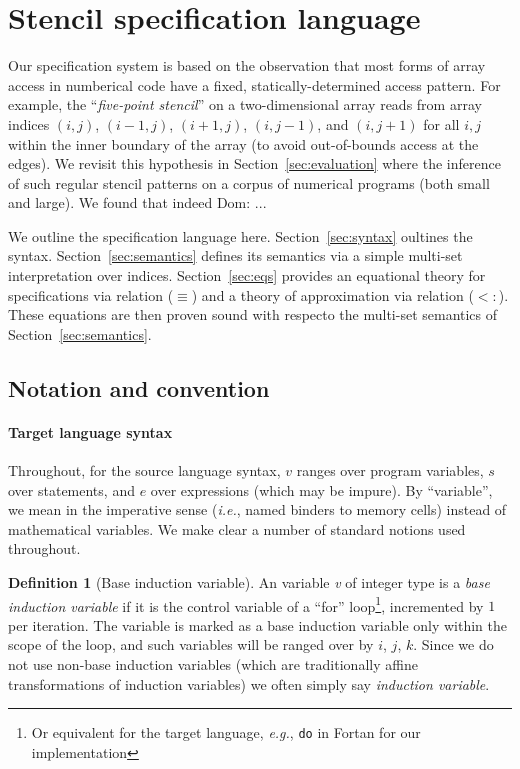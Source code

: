 \documentclass[9pt]{sigplanconf}
\newcommand{\dnote}[1]{\textcolor{darkpurple}{Dom: #1}}
\newcounter{block}
\theoremstyle{definition}
\newtheorem{definition}[block]{Definition}
\newcommand{\ie}{\emph{i.e.}}
\newcommand{\eg}{\emph{e.g.}}
\begin{document}
\section{Stencil specification language}
\label{sec:lang}

Our specification system is based on the observation
that most forms of array access in numberical code have
a fixed, statically-determined access pattern. For example, the
``\emph{five-point stencil}'' on a two-dimensional array reads from array
indices $(i, j)$, $(i-1, j)$, $(i+1, j)$, $(i, j-1)$, and $(i, j+1)$
for all $i, j$ within the inner boundary of the array (to avoid
out-of-bounds access at the edges). We revisit this hypothesis
in Section~\ref{sec:evaluation} where the inference of
such regular stencil patterns on a corpus of numerical programs (both
small and large). We found that indeed \dnote{..}.

We outline the specification language here. Section~\ref{sec:syntax}
oultines the syntax. Section~\ref{sec:semantics} defines its semantics
via a simple multi-set interpretation over indices. Section~\ref{sec:eqs} provides an
equational theory for specifications via relation ($\equiv$) and a
theory of approximation via relation ($<:$). These equations are then
proven sound with respecto the multi-set semantics of Section~\ref{sec:semantics}.

\subsection{Notation and convention}
\label{sec:notation}

\renewcommand*{\arraystretch}{0.8}
\paragraph{Target language syntax} Throughout, for the source language
syntax, $v$ ranges over program variables, $s$ over statements, and
$e$ over expressions (which may be impure).  By ``variable'', we mean
in the imperative sense (\ie{}, named binders to memory cells) instead
of mathematical variables. We make clear a number of standard notions
used throughout.

\begin{definition}[Base induction variable]
  An variable \textit{v} of integer type is a \emph{base induction
    variable} if it is the control variable of a ``for''
  loop\footnote{Or equivalent for the target language, \eg{},
    \texttt{do} in Fortan for our implementation}, incremented by $1$ per
iteration. The variable is marked as a base induction variable
only within the scope of the loop, and such variables will be ranged
over by $i$, $j$, $k$. Since we do not use non-base induction
variables (which are traditionally affine transformations of induction
variables) we often simply say \emph{induction variable}. 
\end{definition}
\end{document}
